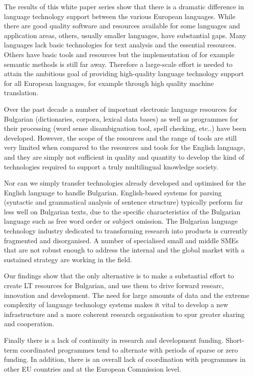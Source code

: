 \begin{multicols}{2}
  The results of this white paper series show that there is a dramatic difference in language technology support between the various European languages. While there are good quality software and resources available for some languages and application areas, others, usually smaller languages, have substantial gaps. Many languages lack basic technologies for text analysis and the essential resources. Others have basic tools and resources but the implementation of for example semantic methods is still far away. Therefore a large-scale effort is needed to attain the ambitious goal of providing high-quality language technology support for all European languages, for example through high quality machine translation. 

  Over the past decade a number of important electronic language resources for Bulgarian (dictionaries, corpora, lexical data bases) as well as programmes for their processing (word sense disambiguation tool, spell checking, etc..) have been developed. However, the scope of the resources and the range of tools are still very limited when compared to the resources and tools for the English language, and they are simply not sufficient in quality and quantity to develop the kind of technologies required to support a truly multilingual knowledge society.
  \columnbreak

  Nor can we simply transfer technologies already developed and optimised for the English language to handle Bulgarian. English-based systems for parsing (syntactic and grammatical analysis of sentence structure) typically perform far less well on Bulgarian texts, due to the specific characteristics of the Bulgarian language such as free word order or subject omission.
  The Bulgarian language technology industry dedicated to transforming research into products is currently fragmented and disorganised. A number of specialised small and middle SMEs that are not robust enough to address the internal and the global market with a sustained strategy are working in the field.

  Our findings show that the only alternative is to make a substantial effort to create LT resources for Bulgarian, and use them to drive forward researc, innovation and development. The need for large amounts of data and the extreme complexity of language technology systems makes it vital to develop a new infrastructure and a more coherent research organisation to spur greater sharing and cooperation.

  Finally there is a lack of continuity in research and development funding. Short-term coordinated programmes tend to alternate with periods of sparse or zero funding. In addition, there is an overall lack of coordination with programmes in other EU countries and at the European Commission level.


\end{multicols}
